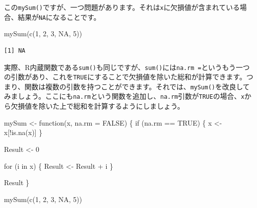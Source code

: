 \documentclass[
  a4paper,
  pandoc,
  ja=standard,
  jafont=haranoaji]{bxjsbook}
\newenvironment{Shaded}{\begin{snugshade}}{\end{snugshade}}
\newcommand{\AttributeTok}[1]{\textcolor[rgb]{0.00,0.48,0.65}{#1}}
\newcommand{\ConstantTok}[1]{\textcolor[rgb]{0.56,0.35,0.01}{#1}}
\newcommand{\ControlFlowTok}[1]{\textcolor[rgb]{0.00,0.48,0.65}{#1}}
\newcommand{\DecValTok}[1]{\textcolor[rgb]{0.68,0.00,0.00}{#1}}
\newcommand{\FunctionTok}[1]{\textcolor[rgb]{0.28,0.35,0.67}{#1}}
\newcommand{\NormalTok}[1]{\textcolor[rgb]{0.00,0.48,0.65}{#1}}
\newcommand{\OtherTok}[1]{\textcolor[rgb]{0.00,0.48,0.65}{#1}}
\newcommand{\SpecialCharTok}[1]{\textcolor[rgb]{0.37,0.37,0.37}{#1}}
\begin{document}
この\texttt{mySum()}ですが、一つ問題があります。それは\texttt{x}に欠損値が含まれている場合、結果が\texttt{NA}になることです。

\begin{Shaded}
\begin{Highlighting}[numbers=left,,]
\FunctionTok{mySum}\NormalTok{(}\FunctionTok{c}\NormalTok{(}\DecValTok{1}\NormalTok{, }\DecValTok{2}\NormalTok{, }\DecValTok{3}\NormalTok{, }\ConstantTok{NA}\NormalTok{, }\DecValTok{5}\NormalTok{))}
\end{Highlighting}
\end{Shaded}

\begin{verbatim}
[1] NA
\end{verbatim}

実際、R内蔵関数である\texttt{sum()}も同じですが、\texttt{sum()}には\texttt{na.rm\ =}というもう一つの引数があり、これを\texttt{TRUE}にすることで欠損値を除いた総和が計算できます。つまり、関数は複数の引数を持つことができます。それでは、\texttt{mySum()}を改良してみましょう。ここにも\texttt{na.rm}という関数を追加し、\texttt{na.rm}引数が\texttt{TRUE}の場合、\texttt{x}から欠損値を除いた上で総和を計算するようにしましょう。

\begin{Shaded}
\begin{Highlighting}[numbers=left,,]
\NormalTok{mySum }\OtherTok{\textless{}{-}} \ControlFlowTok{function}\NormalTok{(x, }\AttributeTok{na.rm =} \ConstantTok{FALSE}\NormalTok{) \{}
  \ControlFlowTok{if}\NormalTok{ (na.rm }\SpecialCharTok{==} \ConstantTok{TRUE}\NormalTok{) \{}
\NormalTok{    x }\OtherTok{\textless{}{-}}\NormalTok{ x[}\SpecialCharTok{!}\FunctionTok{is.na}\NormalTok{(x)]}
\NormalTok{  \}}
  
\NormalTok{  Result }\OtherTok{\textless{}{-}} \DecValTok{0}
  
  \ControlFlowTok{for}\NormalTok{ (i }\ControlFlowTok{in}\NormalTok{ x) \{}
\NormalTok{      Result }\OtherTok{\textless{}{-}}\NormalTok{ Result }\SpecialCharTok{+}\NormalTok{ i}
\NormalTok{  \}}
  
\NormalTok{  Result}
\NormalTok{\}}
\end{Highlighting}
\end{Shaded}

\begin{Shaded}
\begin{Highlighting}[numbers=left,,]
\FunctionTok{mySum}\NormalTok{(}\FunctionTok{c}\NormalTok{(}\DecValTok{1}\NormalTok{, }\DecValTok{2}\NormalTok{, }\DecValTok{3}\NormalTok{, }\ConstantTok{NA}\NormalTok{, }\DecValTok{5}\NormalTok{))}
\end{Highlighting}
\end{Shaded}
\end{document}
